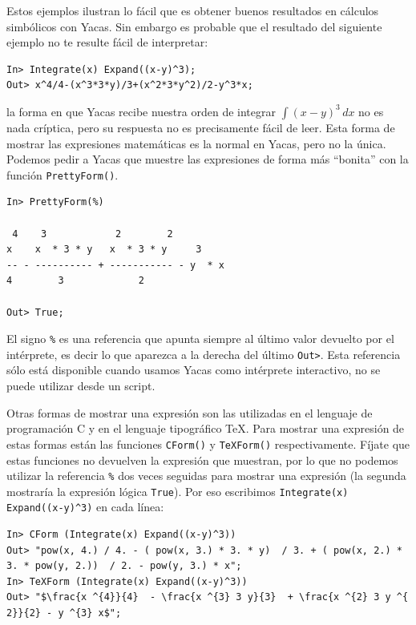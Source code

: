 Estos ejemplos ilustran  lo fácil que es obtener  buenos resultados en
cálculos  simbólicos  con  Yacas.  Sin  embargo  es  probable  que  el
resultado del siguiente ejemplo no te resulte fácil de interpretar:

\begin{verbatim}
In> Integrate(x) Expand((x-y)^3);
Out> x^4/4-(x^3*3*y)/3+(x^2*3*y^2)/2-y^3*x;
\end{verbatim}

la forma en  que Yacas recibe nuestra orden de  integrar $\int (x-y)^3
\, dx$ no es nada críptica, pero su respuesta no es precisamente fácil
de  leer. Esta  forma de  mostrar  las expresiones  matemáticas es  la
normal  en  Yacas,  pero  no  la única.  Podemos  pedir  a  Yacas  que
muestre  las  expresiones  de  forma más  ``bonita''  con  la  función
\verb+PrettyForm()+.


\begin{verbatim}
In> PrettyForm(%)

 4    3            2        2         
x    x  * 3 * y   x  * 3 * y     3    
-- - ---------- + ----------- - y  * x
4        3             2              

Out> True;
\end{verbatim}

El signo \verb+%+ es una referencia que apunta siempre al último valor
devuelto por el intérprete, es decir  lo que aparezca a la derecha del
último \verb+Out>+. Esta referencia sólo está disponible cuando usamos
Yacas  como intérprete  interactivo,  no se  puede  utilizar desde  un
script.

Otras  formas  de mostrar  una  expresión  son  las utilizadas  en  el
lenguaje  de  programación  C  y  en  el  lenguaje  tipográfico  \TeX.
Para  mostrar  una  expresión  de estas  formas  están  las  funciones
\verb+CForm()+  y \verb+TeXForm()+  respectivamente. Fíjate  que estas
funciones  no devuelven  la  expresión  que muestran,  por  lo que  no
podemos  utilizar  la  referencia  \verb+%+ dos  veces  seguidas  para
mostrar  una  expresión  (la  segunda mostraría  la  expresión  lógica
\verb+True+). Por  eso escribimos  \verb+Integrate(x) Expand((x-y)^3)+
en cada línea:


\begin{verbatim}
In> CForm (Integrate(x) Expand((x-y)^3))
Out> "pow(x, 4.) / 4. - ( pow(x, 3.) * 3. * y)  / 3. + ( pow(x, 2.) * 
3. * pow(y, 2.))  / 2. - pow(y, 3.) * x";
In> TeXForm (Integrate(x) Expand((x-y)^3))
Out> "$\frac{x ^{4}}{4}  - \frac{x ^{3} 3 y}{3}  + \frac{x ^{2} 3 y ^{
2}}{2} - y ^{3} x$";
\end{verbatim}

